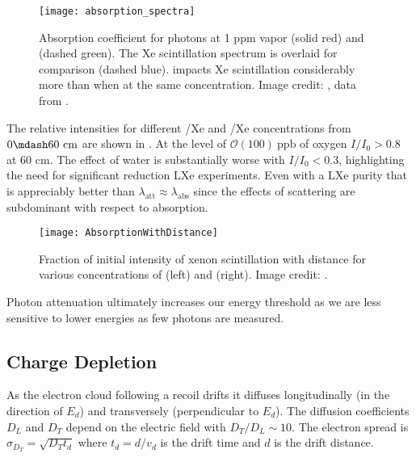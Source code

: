 \begin{figure}
\centering
\texttt{[image: absorption\_spectra]}
\caption[Absorption coefficient for photons at 1 ppm  vapor and .  The Xe scintillation
spectrum is overlaid for comparison.]{Absorption coefficient for photons at 1 ppm  vapor (solid red) and  (dashed green).  The Xe scintillation
spectrum is overlaid for comparison (dashed blue).   impacts Xe scintillation considerably
more than  when at the same concentration.  Image credit: ,  data from .}
\label{fig:importance_procedure_effects_photons_absorption_coefficents}
\end{figure}

The relative intensities for different /Xe and /Xe concentrations from $0 \mdash 60\ \mathrm{cm}$ are shown in
.  At the level of $\mathcal{O}(100)\ \mathrm{ppb}$ of
oxygen $I / I_0 > 0.8$ at 60 cm.  The effect of water is substantially worse with $I / I_0 < 0.3$, highlighting the need for
significant reduction LXe experiments.  Even with a LXe purity that is appreciably better than
 $\lambda_{\mathrm{att}} \approx \lambda_{\mathrm{abs}}$ since
the effects of scattering are subdominant with respect to absorption.

\begin{figure}
\centering
\texttt{[image: AbsorptionWithDistance]}
\caption{Fraction of initial intensity of xenon scintillation with distance for various concentrations of \htwoo (left) and \otwo
(right).  Image credit: .}
\label{fig:importance_procedure_effects_photons_absorption_distance}
\end{figure}

Photon attenuation ultimately increases our energy threshold as we are less sensitive to lower energies as few photons are
measured.



\subsection{Charge Depletion}
\label{subsubsec:importance_procedure_effects_charge}
As the electron cloud following a recoil drifts it diffuses
longitudinally (in the direction of $E_{d}$) and transversely (perpendicular to $E_{d}$).  The
diffusion coefficients $D_{L}$ and $D_{T}$ depend on the electric field with $D_{T}/D_{L} \sim 10$.  The electron spread is
$\sigma_{D_{T}} = \sqrt{D_{T} t_{d}}$ where $t_{d} = d/v_{d}$ is the drift time and $d$ is the drift distance.

